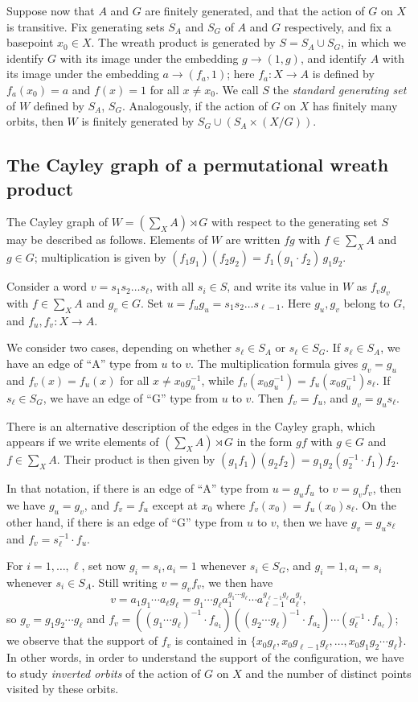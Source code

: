 \documentclass{amsart}
\theoremstyle{definition}
\begin{document}
Suppose now that $A$ and $G$ are finitely generated, and that the
action of $G$ on $X$ is transitive.  Fix generating sets $S_A$ and
$S_G$ of $A$ and $G$ respectively, and fix a basepoint $x_0\in X$. The
wreath product is generated by $S=S_A \cup S_G$, in which we identify
$G$ with its image under the embedding $g \to (1,g)$, and identify $A$
with its image under the embedding $a \to (f_a,1)$; here $f_a:X \to
A$ is defined by $f_a(x_0)=a$ and $f(x)=1$ for all $x\ne x_0$. We call
$S$ the \emph{standard generating set} of $W$ defined by $S_A$, $S_G$.
Analogously, if the action of $G$ on $X$ has finitely many orbits,
then $W$ is finitely generated by $S_G\cup (S_A\times (X/G))$.

\subsection{The Cayley graph of a permutational wreath product} The
Cayley graph of $W=(\sum_XA)\rtimes G$ with respect to the generating
set $S$ may be described as follows. Elements of $W$ are written $fg$
with $f\in\sum_XA$ and $g\in G$; multiplication is given by
$(f_1g_1)(f_2g_2)=f_1(g_1\cdot f_2)\,g_1g_2$.

Consider a word $v=s_1s_2 \dots s_\ell$, with all $s_i \in S$, and
write its value in $W$ as $f_vg_v$ with $f\in\sum_XA$ and $g_v\in
G$. Set $u=f_ug_u= s_1 s_2 \dots s_{\ell-1}$. Here $g_u, g_v$ belong
to $G$, and $f_u, f_v:X\to A$.

We consider two cases, depending on whether $s_\ell\in S_A$ or
$s_\ell\in S_G$. If $s_\ell\in S_A$, we have an edge of ``A'' type
from $u$ to $v$. The multiplication formula gives $g_v=g_u$ and
$f_v(x)=f_u(x)$ for all $x\neq x_0g_u^{-1}$, while
$f_v(x_0g_u^{-1})=f_u(x_0g_u^{-1})s_\ell$.  If $s_\ell\in S_G$, we
have an edge of ``G'' type from $u$ to $v$. Then $f_v=f_u$, and
$g_v=g_us_\ell$.

There is an alternative description of the edges in the Cayley graph,
which appears if we write elements of $(\sum_XA)\rtimes G$ in the form
$gf$ with $g\in G$ and $f\in\sum_XA$. Their product is then given by
$(g_1f_1)(g_2f_2)=g_1g_2(g_2^{-1}\cdot f_1)f_2$.

In that notation, if there is an edge of ``A'' type from $u=g_uf_u$ to
$v=g_vf_v$, then we have $g_u=g_v$, and $f_v=f_u$ except at $x_0$
where $f_v(x_0)=f_u(x_0)s_\ell$.  On the other hand, if there is an
edge of ``G'' type from $u$ to $v$, then we have $g_v=g_us_\ell$ and
$f_v=s_\ell^{-1}\cdot f_u$.

For $i=1,\dots,\ell$, set now $g_i=s_i,a_i=1$ whenever $s_i\in S_G$,
and $g_i=1,a_i=s_i$ whenever $s_i\in S_A$. Still writing $v=g_vf_v$,
we then have
\[v=a_1g_1\cdots a_\ell g_\ell=g_1\cdots g_\ell a_1^{g_1\cdots g_\ell}\cdots a_{\ell-1}^{g_{\ell-1}g_\ell}a_\ell^{g_\ell},
\]
so $g_v=g_1 g_2 \cdots g_\ell$ and $f_v=((g_1\cdots g_\ell)^{-1}\cdot
f_{a_1})((g_2\cdots g_\ell)^{-1}\cdot f_{a_2})\cdots (g_\ell^{-1}\cdot
f_{a_\ell})$; we observe that the support of $f_v$ is contained in
$\{x_0 g_\ell,x_0g_{\ell-1}g_\ell,\dots,x_0g_1g_2\cdots g_\ell\}$. In
other words, in order to understand the support of the configuration,
we have to study \emph{inverted orbits} of the action of $G$ on $X$
and the number of distinct points visited by these orbits.
\end{document}
